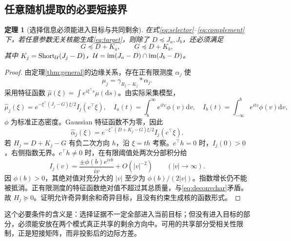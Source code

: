 \documentclass[UTF8,fontset=fandol,zihao=5,a4paper]{ctexart}
\newcommand{\dd}{\mathrm d}\newcommand{\given}{\,|\,}
\newtheorem{theorem}{定理}[section]
\theoremstyle{definition}
\theoremstyle{remark}\newtheorem{remark}[theorem]{说明}
\numberwithin{equation}{section}
\begin{document}
\subsection{任意随机提取的必要短接界}
\begin{theorem}[选择信息必须能进入目标与共同剩余]
\label{thm:necessaryshort}
在式\eqref{eq:selector}--\eqref{eq:complement}下，若任意参数无关核能生成\eqref{eq:target}，则除了 $D\preceq J_a,J_b$，还必须满足
\begin{equation}
\boxed{G\preceq D+K_a,\qquad G\preceq D+K_b,}
\label{eq:necessaryshort}
\end{equation}
其中 $K_j=\operatorname{Short}_{\mathcal U}(J_j-D)$，$\mathcal U=\operatorname{im}(J_a-D)\cap\operatorname{im}(J_b-D)$。
\end{theorem}
\begin{proof}
由定理\ref{thm:general}的边缘关系，存在正有限测度 $\alpha_j$ 使
\[
\mu_j=\gamma_{R_j-K_j}*\alpha_j.
\]
采用特征函数 $\widehat\mu(\xi)=\int e^{i\xi^\top s}\mu(\dd s)$。由实际采集模型，
\begin{equation}
\widehat\mu_j(\xi)
=e^{-\xi^\top(J_j-G)\xi/2}I_j(c^\top\xi),\quad
I_a(t)=\int_b^\infty e^{itv}\phi(v)\dd v,
\quad I_b(t)=\int_{-\infty}^b e^{itv}\phi(v)\dd v,
\end{equation}
$\phi$ 为标准正态密度。Gaussian 特征函数不为零，因此
\begin{equation}
\widehat\alpha_j(\xi)
=e^{-\xi^\top(D+K_j-G)\xi/2}I_j(c^\top\xi).
\label{eq:deconvchar}
\end{equation}
若 $H_j=D+K_j-G$ 有负二次方向 $h$，沿 $\xi=th$ 考察。$c^\top h=0$ 时，$I_j(0)>0$，右侧指数无界。$c^\top h\ne0$ 时，在有限阈值处两次分部积分给
\[
I_j(v)=\frac{\pm\phi(b)e^{ivb}}{iv}+O(|v|^{-2})
\qquad(|v|\to\infty).
\]
因 $\phi(b)>0$，其绝对值对充分大的 $|v|$ 至少为 $\phi(b)/(2|v|)$。指数增长仍不能被抵消。正有限测度的特征函数绝对值不超过其总质量，与\eqref{eq:deconvchar}矛盾。故 $H_j\succeq0$。证明允许奇异剩余和奇异目标，且没有约束生成核的函数形式。
\end{proof}

这个必要条件的含义是：选择证据不一定全部进入当前目标；但没有进入目标的部分，必须能安放在两个模式真正共享的剩余方向中。可用的共享部分受相关性限制，正是短接矩阵，而非投影后的边际方差。
\end{document}
